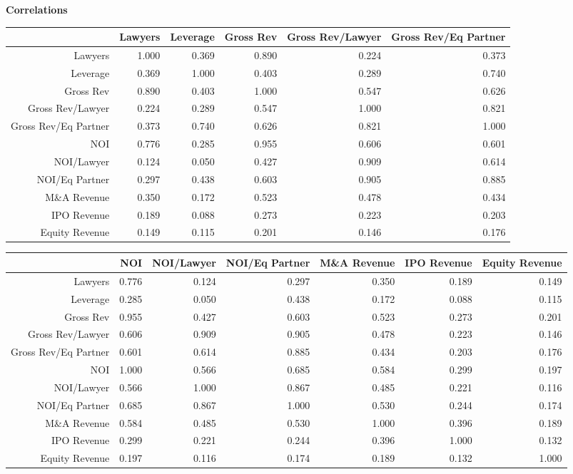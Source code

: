 \documentclass{article}
\begin{document}
{\large \textbf{Correlations} }
\begin{table}[H]
\centering
\begin{tabular}{rrrrrr}
  \hline
 & Lawyers & Leverage & Gross Rev & Gross Rev/Lawyer & Gross Rev/Eq Partner \\ 
  \hline
Lawyers & 1.000 & 0.369 & 0.890 & 0.224 & 0.373 \\ 
  Leverage & 0.369 & 1.000 & 0.403 & 0.289 & 0.740 \\ 
  Gross Rev & 0.890 & 0.403 & 1.000 & 0.547 & 0.626 \\ 
  Gross Rev/Lawyer & 0.224 & 0.289 & 0.547 & 1.000 & 0.821 \\ 
  Gross Rev/Eq Partner & 0.373 & 0.740 & 0.626 & 0.821 & 1.000 \\ 
  NOI & 0.776 & 0.285 & 0.955 & 0.606 & 0.601 \\ 
  NOI/Lawyer & 0.124 & 0.050 & 0.427 & 0.909 & 0.614 \\ 
  NOI/Eq Partner & 0.297 & 0.438 & 0.603 & 0.905 & 0.885 \\ 
  M\&A Revenue & 0.350 & 0.172 & 0.523 & 0.478 & 0.434 \\ 
  IPO Revenue & 0.189 & 0.088 & 0.273 & 0.223 & 0.203 \\ 
  Equity Revenue & 0.149 & 0.115 & 0.201 & 0.146 & 0.176 \\ 
   \hline
\end{tabular}
\end{table}
\begin{table}[H]
\centering
\begin{tabular}{rrrrrrr}
  \hline
 & NOI & NOI/Lawyer & NOI/Eq Partner & M\&A Revenue & IPO Revenue & Equity Revenue \\ 
  \hline
Lawyers & 0.776 & 0.124 & 0.297 & 0.350 & 0.189 & 0.149 \\ 
  Leverage & 0.285 & 0.050 & 0.438 & 0.172 & 0.088 & 0.115 \\ 
  Gross Rev & 0.955 & 0.427 & 0.603 & 0.523 & 0.273 & 0.201 \\ 
  Gross Rev/Lawyer & 0.606 & 0.909 & 0.905 & 0.478 & 0.223 & 0.146 \\ 
  Gross Rev/Eq Partner & 0.601 & 0.614 & 0.885 & 0.434 & 0.203 & 0.176 \\ 
  NOI & 1.000 & 0.566 & 0.685 & 0.584 & 0.299 & 0.197 \\ 
  NOI/Lawyer & 0.566 & 1.000 & 0.867 & 0.485 & 0.221 & 0.116 \\ 
  NOI/Eq Partner & 0.685 & 0.867 & 1.000 & 0.530 & 0.244 & 0.174 \\ 
  M\&A Revenue & 0.584 & 0.485 & 0.530 & 1.000 & 0.396 & 0.189 \\ 
  IPO Revenue & 0.299 & 0.221 & 0.244 & 0.396 & 1.000 & 0.132 \\ 
  Equity Revenue & 0.197 & 0.116 & 0.174 & 0.189 & 0.132 & 1.000 \\ 
   \hline
\end{tabular}
\end{table}
\end{document}
